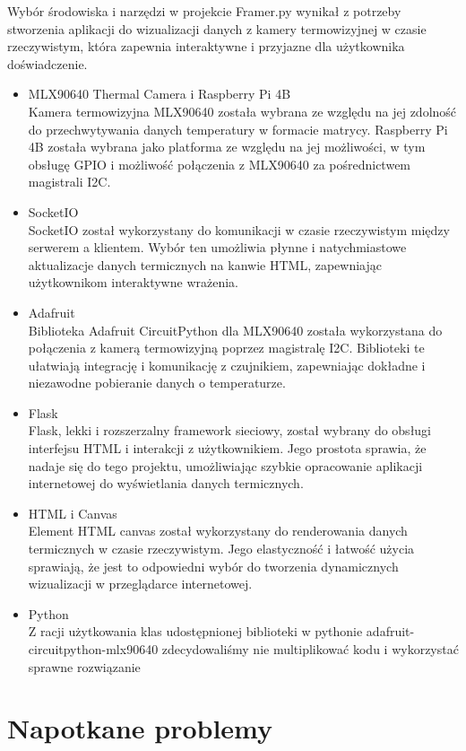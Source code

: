 \documentclass[a4paper,twoside,12pt]{book}
\begin{document}
Wybór środowiska i narzędzi w projekcie Framer.py wynikał z potrzeby stworzenia aplikacji do wizualizacji danych z kamery termowizyjnej w czasie rzeczywistym, która zapewnia interaktywne i przyjazne dla użytkownika doświadczenie.
\begin{itemize}
\item MLX90640 Thermal Camera i Raspberry Pi 4B 
\\Kamera termowizyjna MLX90640 została wybrana ze względu na jej zdolność do przechwytywania danych temperatury w formacie matrycy. Raspberry Pi 4B została wybrana jako platforma ze względu na jej możliwości, w tym obsługę GPIO i możliwość połączenia z MLX90640 za pośrednictwem magistrali I2C.

 
\item SocketIO
\\SocketIO został wykorzystany do komunikacji w czasie rzeczywistym między serwerem a klientem. Wybór ten umożliwia płynne i natychmiastowe aktualizacje danych termicznych na kanwie HTML, zapewniając użytkownikom interaktywne wrażenia.
\item Adafruit 
\\Biblioteka Adafruit CircuitPython dla MLX90640 została wykorzystana do połączenia z kamerą termowizyjną poprzez magistralę I2C. Biblioteki te ułatwiają integrację i komunikację z czujnikiem, zapewniając dokładne i niezawodne pobieranie danych o temperaturze.
\item Flask
\\Flask, lekki i rozszerzalny framework sieciowy, został wybrany do obsługi interfejsu HTML i interakcji z użytkownikiem. Jego prostota sprawia, że nadaje się do tego projektu, umożliwiając szybkie opracowanie aplikacji internetowej do wyświetlania danych termicznych.
\item HTML i Canvas
\\Element HTML canvas został wykorzystany do renderowania danych termicznych w czasie rzeczywistym. Jego elastyczność i łatwość użycia sprawiają, że jest to odpowiedni wybór do tworzenia dynamicznych wizualizacji w przeglądarce internetowej.
\item Python 
\\ Z racji użytkowania klas udostępnionej biblioteki w pythonie adafruit-circuitpython-mlx90640 zdecydowaliśmy nie multiplikować kodu i wykorzystać sprawne rozwiązanie
\end{itemize}

\section{Napotkane problemy}
\end{document}
